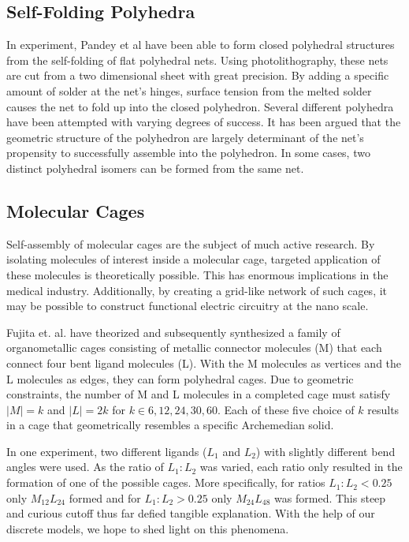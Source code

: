 \subsection{Self-Folding Polyhedra}

In experiment, Pandey et al have been able to form closed polyhedral structures from the self-folding of flat polyhedral nets. Using photolithography, these nets are cut from a two dimensional sheet with great precision. By adding a specific amount of solder at the net's hinges, surface tension from the melted solder causes the net to fold up into the closed polyhedron. Several different polyhedra have been attempted with varying degrees of success. It has been argued that the geometric structure of the polyhedron are largely determinant of the net's propensity to successfully assemble into the polyhedron. In some cases, two distinct polyhedral isomers can be formed from the same net.

\subsection{Molecular Cages}

Self-assembly of molecular cages are the subject of much active research. By isolating molecules of interest inside a molecular cage, targeted application of these molecules is theoretically possible. This has enormous implications in the medical industry. Additionally, by creating a grid-like network of such cages, it may be possible to construct functional electric circuitry at the nano scale. 

Fujita et. al. have theorized and subsequently synthesized a family of organometallic cages consisting of metallic connector molecules (M) that each connect four bent ligand molecules (L). With the M molecules as vertices and the L molecules as edges, they can form polyhedral cages. Due to geometric constraints, the number of M and L molecules in  a completed cage must satisfy  $|M| = k$ and $|L| = 2k$ for $k \in 6, 12, 24, 30, 60$. Each of these five choice of $k$ results in a cage that geometrically resembles a specific Archemedian solid. 

In one experiment, two different ligands ($L_1$ and $L_2$) with slightly different bend angles were used. As the ratio of $L_1:L_2$ was varied, each ratio only resulted in the formation of one of the possible cages. More specifically, for ratios $L_1:L_2 < 0.25$ only $M_{12}L_{24}$ formed and for  $L_1:L_2 > 0.25$ only $M_{24}L_{48}$ was formed. This steep and curious cutoff thus far defied tangible explanation. With the help of our discrete models, we hope to shed light on this phenomena. 

